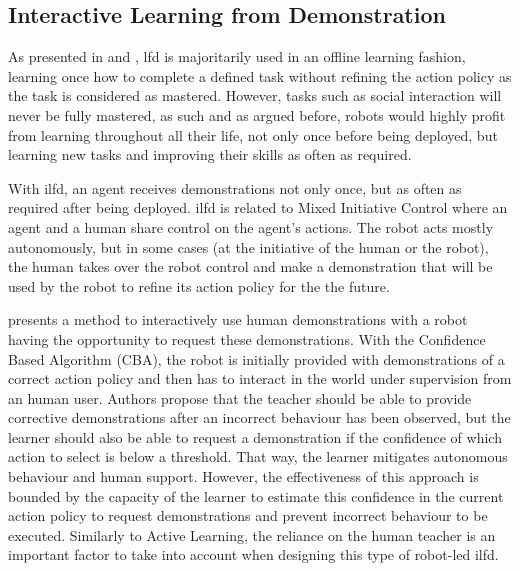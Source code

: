 
\subsection{Interactive Learning from Demonstration}

As presented in \cite{argall2009survey} and \cite{billard2008robot}, \gls{lfd} is majoritarily used in an offline learning fashion, learning once how to complete a defined task without refining the action policy as the task is considered as mastered. However, tasks such as social interaction will never be fully mastered, as such and as argued before, robots would highly profit from learning throughout all their life, not only once before being deployed, but learning new tasks and improving their skills as often as required.

With \gls{ilfd}, an agent receives demonstrations not only once, but as often as required after being deployed. \gls{ilfd} is related to Mixed Initiative Control \citep{adams2004mixed} where an agent and a human share control on the agent's actions. The robot acts mostly autonomously, but in some cases (at the initiative of the human or the robot), the human takes over the robot control and make a demonstration that will be used by the robot to refine its action policy for the the future.

\cite{chernova2009} presents a method to interactively use human demonstrations with a robot having the opportunity to request these demonstrations. With the Confidence Based Algorithm (CBA), the robot is initially provided with demonstrations of a correct action policy and then has to interact in the world under supervision from an human user. Authors propose that the teacher should be able to provide corrective demonstrations after an incorrect behaviour has been observed, but the learner should also be able to request a demonstration if the confidence of which action to select is below a threshold. That way, the learner mitigates autonomous behaviour and human support. However, the effectiveness of this approach is bounded by the capacity of the learner to estimate this confidence in the current action policy to request demonstrations and prevent incorrect behaviour to be executed. 
Similarly to Active Learning, the reliance on the human teacher is an important factor to take into account when designing this type of robot-led \gls{ilfd}.

